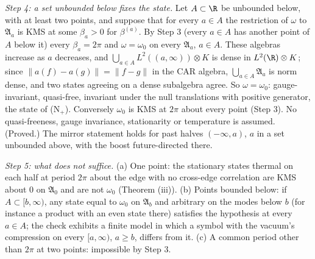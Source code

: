 \emph{Step 4: a set unbounded below fixes the state.} Let $A \subset \R$ be unbounded below, with at least two points, and suppose that for every $a \in A$ the restriction of $\omega$ to $\mathfrak{A}_{a}$ is KMS at some $\beta_{a} > 0$ for $\beta^{(a)}$. By Step 3 (every $a \in A$ has another point of $A$ below it) every $\beta_{a} = 2\pi$ and $\omega = \omega_{0}$ on every $\mathfrak{A}_{a}$, $a \in A$. These algebras increase as $a$ decreases, and $\bigcup_{a \in A}L^{2}((a, \infty))\otimes K$ is dense in $L^{2}(\R)\otimes K$; since $\|a(f) - a(g)\| = \|f - g\|$ in the CAR algebra, $\bigcup_{a \in A}\mathfrak{A}_{a}$ is norm dense, and two states agreeing on a dense subalgebra agree. So $\omega = \omega_{0}$: gauge-invariant, quasi-free, invariant under the null translations with positive generator, the state of (N$_{+}$). Conversely $\omega_{0}$ is KMS at $2\pi$ about every point (Step 3). No quasi-freeness, gauge invariance, stationarity or temperature is assumed. (Proved.) The mirror statement holds for past halves $(-\infty, a)$, $a$ in a set unbounded above, with the boost future-directed there.

\emph{Step 5: what does not suffice.} (a) One point: the stationary states thermal on each half at period $2\pi$ about the edge with no cross-edge correlation are KMS about $0$ on $\mathfrak{A}_{0}$ and are not $\omega_{0}$ (Theorem (iii)). (b) Points bounded below: if $A \subset [b, \infty)$, any state equal to $\omega_{0}$ on $\mathfrak{A}_{b}$ and arbitrary on the modes below $b$ (for instance a product with an even state there) satisfies the hypothesis at every $a \in A$; the check exhibits a finite model in which a symbol with the vacuum's compression on every $[a, \infty)$, $a \ge b$, differs from it. (c) A common period other than $2\pi$ at two points: impossible by Step 3.


